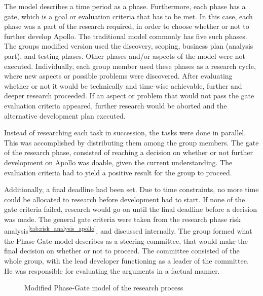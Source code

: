 The model describes a time period as a phase. Furthermore, each phase has a gate, which is a goal or evaluation criteria that has to be met. In this case, each phase was a part of the research required, in order to choose whether or not to further develop Apollo. The traditional model commonly has five such phases. The groups modified version used the discovery, scoping, business plan (analysis part), and testing phases. Other phases and/or aspects of the model were not executed. Individually, each group member used these phases as a research cycle, where new aspects or possible problems were discovered. After evaluating whether or not it would be technically and time-wise achievable, further and deeper research proceeded. If an aspect or problem that would not pass the gate evaluation criteria appeared, further research would be aborted and the alternative development plan executed.

Instead of researching each task in succession, the tasks were done in parallel. This was accomplished by distributing them among the group members. The gate of the research phase, consisted of reaching a decision on whether or not further development on Apollo was doable, given the current understanding. The evaluation criteria had to yield a positive result for the group to proceed.

Additionally, a final deadline had been set. Due to time constraints, no more time could be allocated to research before development had to start. If none of the gate criteria failed, research would go on until the final deadline before a decision was made. The general gate criteria were taken from the research phase risk analysis\textsuperscript{\ref{tab:risk_analysis_apollo}}, and discussed internally. The group formed what the Phase-Gate model describes as a steering-committee, that would make the final decision on whether or not to proceed. The committee consisted of the whole group, with the lead developer functioning as a leader of the committee. He was responsible for evaluating the arguments in a factual manner.

\begin{center}
  \begin{figure}[ht!]
    \caption{Modified Phase-Gate model of the research process}
    \label{fig:phasegate}
  \end{figure}
\end{center}


